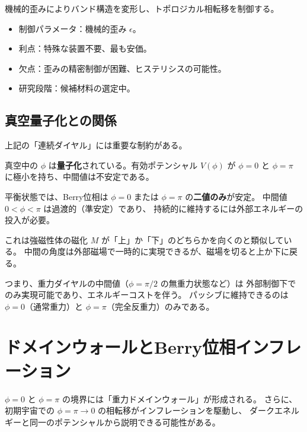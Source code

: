 機械的歪みによりバンド構造を変形し、トポロジカル相転移を制御する。

\begin{itemize}
  \item 制御パラメータ：機械的歪み $\epsilon$。
  \item 利点：特殊な装置不要、最も安価。
  \item 欠点：歪みの精密制御が困難、ヒステリシスの可能性。
  \item 研究段階：候補材料の選定中。
\end{itemize}

\section{真空量子化との関係}
\label{sec:12.4}

上記の「連続ダイヤル」には重要な制約がある。

真空中の $\phi$ は\textbf{量子化}されている。有効ポテンシャル $V(\phi)$ が
$\phi = 0$ と $\phi = \pi$ に極小を持ち、中間値は不安定である。

\begin{warningbox}[真空量子化の制約]
平衡状態では、Berry位相は $\phi = 0$ または $\phi = \pi$ の\textbf{二値のみ}が安定。
中間値 $0 < \phi < \pi$ は過渡的（準安定）であり、
持続的に維持するには外部エネルギーの投入が必要。
\end{warningbox}

これは強磁性体の磁化 $M$ が「上」か「下」のどちらかを向くのと類似している。
中間の角度は外部磁場で一時的に実現できるが、磁場を切ると上か下に戻る。

つまり、重力ダイヤルの中間値（$\phi = \pi/2$ の無重力状態など）は
外部制御下でのみ実現可能であり、エネルギーコストを伴う。
パッシブに維持できるのは $\phi = 0$（通常重力）と $\phi = \pi$（完全反重力）のみである。


\chapter{ドメインウォールとBerry位相インフレーション}
\label{ch:domain-walls}

\begin{keyresult}[本章の主題]
$\phi = 0$ と $\phi = \pi$ の境界には「重力ドメインウォール」が形成される。
さらに、初期宇宙での $\phi = \pi \to 0$ の相転移がインフレーションを駆動し、
ダークエネルギーと同一のポテンシャルから説明できる可能性がある。
\end{keyresult}

